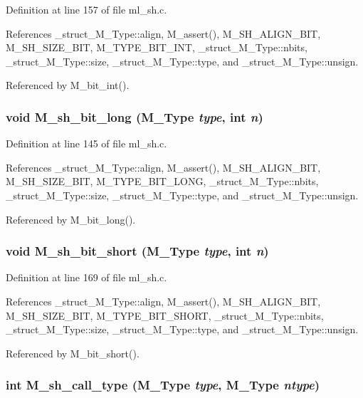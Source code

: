 Definition at line 157 of file ml\_\-sh.c.

References \_\-struct\_\-M\_\-Type::align, M\_\-assert(), M\_\-SH\_\-ALIGN\_\-BIT, M\_\-SH\_\-SIZE\_\-BIT, M\_\-TYPE\_\-BIT\_\-INT, \_\-struct\_\-M\_\-Type::nbits, \_\-struct\_\-M\_\-Type::size, \_\-struct\_\-M\_\-Type::type, and \_\-struct\_\-M\_\-Type::unsign.

Referenced by M\_\-bit\_\-int().
\subsubsection{\setlength{\rightskip}{0pt plus 5cm}void M\_\-sh\_\-bit\_\-long (\bf{M\_\-Type} {\em type}, int {\em n})}\label{ml__sh_8c_63b5f196e1f41bda218a0aea42881c7e}




Definition at line 145 of file ml\_\-sh.c.

References \_\-struct\_\-M\_\-Type::align, M\_\-assert(), M\_\-SH\_\-ALIGN\_\-BIT, M\_\-SH\_\-SIZE\_\-BIT, M\_\-TYPE\_\-BIT\_\-LONG, \_\-struct\_\-M\_\-Type::nbits, \_\-struct\_\-M\_\-Type::size, \_\-struct\_\-M\_\-Type::type, and \_\-struct\_\-M\_\-Type::unsign.

Referenced by M\_\-bit\_\-long().
\subsubsection{\setlength{\rightskip}{0pt plus 5cm}void M\_\-sh\_\-bit\_\-short (\bf{M\_\-Type} {\em type}, int {\em n})}\label{ml__sh_8c_8df4d70c8155e78ce835733438caf26e}




Definition at line 169 of file ml\_\-sh.c.

References \_\-struct\_\-M\_\-Type::align, M\_\-assert(), M\_\-SH\_\-ALIGN\_\-BIT, M\_\-SH\_\-SIZE\_\-BIT, M\_\-TYPE\_\-BIT\_\-SHORT, \_\-struct\_\-M\_\-Type::nbits, \_\-struct\_\-M\_\-Type::size, \_\-struct\_\-M\_\-Type::type, and \_\-struct\_\-M\_\-Type::unsign.

Referenced by M\_\-bit\_\-short().
\subsubsection{\setlength{\rightskip}{0pt plus 5cm}int M\_\-sh\_\-call\_\-type (\bf{M\_\-Type} {\em type}, \bf{M\_\-Type} {\em ntype})}\label{ml__sh_8c_f3f5facc03dbe7ce158824e90db437a4}




